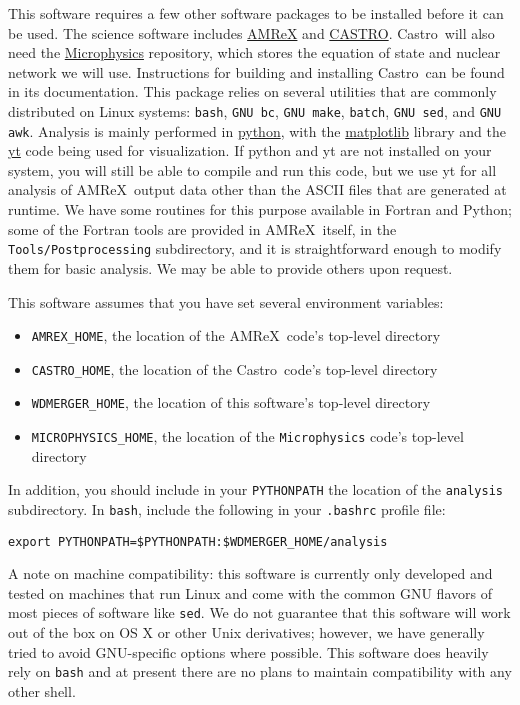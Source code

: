 \documentclass[12pt]{book}
\newcommand{\castro}{{\sf Castro}}
\newcommand{\amrex}{{\sf AMReX}}
\begin{document}
This software requires a few other software packages to be installed before it can be used.
The science software includes \href{https://github.com/AMReX-Codes/amrex}{AMReX} and 
\href{https://github.com/AMReX-Astro/Castro}{CASTRO}. \castro\ will also need
the \href{https://github.com/starkiller-astro/Microphysics}{Microphysics} repository, 
which stores the equation of state and nuclear network we will use. Instructions for
building and installing \castro\ can be found in its documentation.
This package relies on several utilities that are
commonly distributed on Linux systems: \texttt{bash}, \texttt{GNU bc}, \texttt{GNU make}, 
\texttt{batch}, \texttt{GNU sed}, and \texttt{GNU awk}. Analysis is mainly performed in 
\href{https://www.python.org/}{python}, with the \href{http://matplotlib.org/}{matplotlib} 
library and the \href{http://yt-project.org/}{yt} code being used for visualization. 
If python and yt are not installed on your system, you will still be able to compile and 
run this code, but we use yt for all analysis of \amrex\ output data other than 
the ASCII files that are generated at runtime. We have some routines for this purpose 
available in Fortran and Python; some of the Fortran tools are provided in \amrex\ 
itself, in the \texttt{Tools/Postprocessing} subdirectory, and it is straightforward enough 
to modify them for basic analysis. We may be able to provide others upon request.

This software assumes that you have set several environment variables:
\begin{itemize}
  \item \texttt{AMREX\_HOME}, the location of the \amrex\ code's top-level directory
  \item \texttt{CASTRO\_HOME}, the location of the \castro\ code's top-level directory
  \item \texttt{WDMERGER\_HOME}, the location of this software's top-level directory
  \item \texttt{MICROPHYSICS\_HOME}, the location of the \texttt{Microphysics} code's top-level directory
\end{itemize}

In addition, you should include in your \texttt{PYTHONPATH} the location of the 
\texttt{analysis} subdirectory. In \texttt{bash}, include the following in your 
\texttt{.bashrc} profile file:

\texttt{export PYTHONPATH=\$PYTHONPATH:\$WDMERGER\_HOME/analysis}

A note on machine compatibility: this software is currently only developed and tested on
machines that run Linux and come with the common GNU flavors of most pieces of software
like \texttt{sed}. We do not guarantee that this software will work out of the box on OS X
or other Unix derivatives; however, we have generally tried to avoid GNU-specific options
where possible. This software does heavily rely on \texttt{bash} and at present there are
no plans to maintain compatibility with any other shell.
\end{document}
